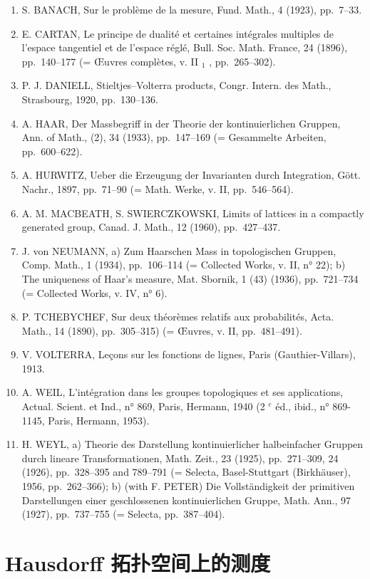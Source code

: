 \begin{enumerate}
\def\labelenumi{(\Roman{enumi})}
\item
  S. BANACH, Sur le problème de la mesure, Fund. Math., 4 (1923), pp.~7--33.
\item
  E. CARTAN, Le principe de dualité et certaines intégrales multiples de l'espace tangentiel et de l'espace réglé, Bull. Soc. Math. France, 24 (1896), pp.~140--177 (= Œuvres complètes, v. II \(_{1}\) , pp.~265--302).
\item
  P. J. DANIELL, Stieltjes--Volterra products, Congr. Intern. des Math., Strasbourg, 1920, pp.~130--136.
\item
  A. HAAR, Der Massbegriff in der Theorie der kontinuierlichen Gruppen, Ann. of Math., (2), 34 (1933), pp.~147--169 (= Gesammelte Arbeiten, pp.~600--622).
\item
  A. HURWITZ, Ueber die Erzeugung der Invarianten durch Integration, Gött. Nachr., 1897, pp.~71--90 (= Math. Werke, v. II, pp.~546--564).
\item
  A. M. MACBEATH, S. SWIERCZKOWSKI, Limits of lattices in a compactly generated group, Canad. J. Math., 12 (1960), pp.~427--437.
\item
  J. von NEUMANN, a) Zum Haarschen Mass in topologischen Gruppen, Comp. Math., 1 (1934), pp.~106--114 (= Collected Works, v. II, n° 22); b) The uniqueness of Haar's measure, Mat. Sbornik, 1 (43) (1936), pp.~721--734 (= Collected Works, v. IV, n° 6).
\item
  P. TCHEBYCHEF, Sur deux théorèmes relatifs aux probabilités, Acta. Math., 14 (1890), pp.~305--315) (= Œuvres, v. II, pp.~481--491).
\item
  V. VOLTERRA, Leçons sur les fonctions de lignes, Paris (Gauthier-Villars), 1913.
\item
  A. WEIL, L'intégration dans les groupes topologiques et ses applications, Actual. Scient. et Ind., n° 869, Paris, Hermann, 1940 (2 \(^{e}\) éd., ibid., n° 869-1145, Paris, Hermann, 1953).
\item
  H. WEYL, a) Theorie des Darstellung kontinuierlicher halbeinfacher Gruppen durch lineare Transformationen, Math. Zeit., 23 (1925), pp.~271--309, 24 (1926), pp.~328--395 and 789--791 (= Selecta, Basel-Stuttgart (Birkhäuser), 1956, pp.~262--366); b) (with F. PETER) Die Vollständigkeit der primitiven Darstellungen einer geschlossenen kontinuierlichen Gruppe, Math. Ann., 97 (1927), pp.~737--755 (= Selecta, pp.~387--404).
\end{enumerate}

\chapter{Hausdorff 拓扑空间上的测度}

